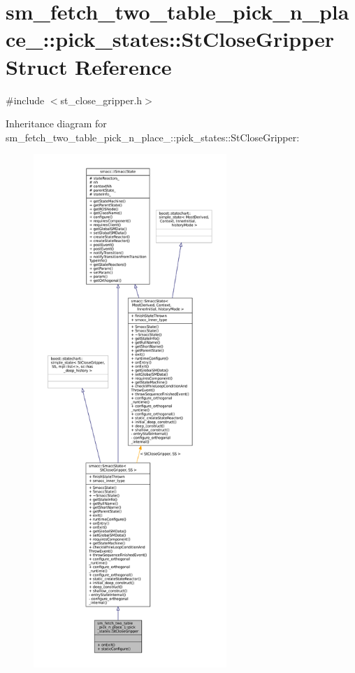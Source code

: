 \hypertarget{structsm__fetch__two__table__pick__n__place__1_1_1pick__states_1_1StCloseGripper}{}\section{sm\+\_\+fetch\+\_\+two\+\_\+table\+\_\+pick\+\_\+n\+\_\+place\+\_\+:\+:pick\+\_\+states\+:\+:St\+Close\+Gripper Struct Reference}
\label{structsm__fetch__two__table__pick__n__place__1_1_1pick__states_1_1StCloseGripper}


{\ttfamily \#include $<$st\+\_\+close\+\_\+gripper.\+h$>$}



Inheritance diagram for sm\+\_\+fetch\+\_\+two\+\_\+table\+\_\+pick\+\_\+n\+\_\+place\+\_\+:\+:pick\+\_\+states\+:\+:St\+Close\+Gripper\+:
\nopagebreak
\begin{figure}[H]
\begin{center}
\leavevmode
\includegraphics[height=550pt]{structsm__fetch__two__table__pick__n__place__1_1_1pick__states_1_1StCloseGripper__inherit__graph}
\end{center}
\end{figure}


